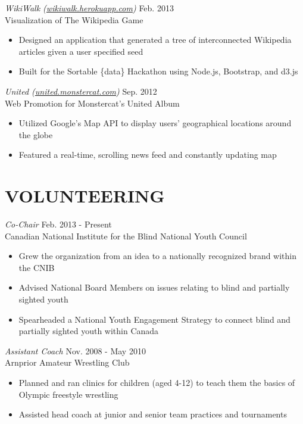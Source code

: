 \documentclass[margin]{res}
\begin{document}
\begin{resume}
{\sl WikiWalk (\href{http://wikiwalk.herokuapp.com}{wikiwalk.herokuapp.com}) } \hfill Feb. 2013 \\
Visualization of The Wikipedia Game
\begin{itemize} \itemsep -2pt
  \item Designed an application that generated a tree of interconnected Wikipedia articles given a user specified seed
  \item Built for the Sortable \{data\} Hackathon using Node.js, Bootstrap, and d3.js
\end{itemize}

{\sl United (\href{http://united.monstercat.com}{united.monstercat.com}) } \hfill Sep. 2012 \\
Web Promotion for Monstercat's United Album
\begin{itemize} \itemsep -2pt
  \item Utilized Google's Map API to display users' geographical locations around the globe
  \item Featured a real-time, scrolling news feed and constantly updating map
\end{itemize}

\section{VOLUNTEERING}
{\sl Co-Chair} \hfill Feb. 2013 - Present\\
Canadian National Institute for the Blind National Youth Council
\begin{itemize} \itemsep -2pt
	\item Grew the organization from an idea to a nationally recognized brand within the CNIB
	\item Advised National Board Members on issues relating to blind and partially sighted youth
  \item Spearheaded a National Youth Engagement Strategy to connect blind and partially sighted youth within Canada
\end{itemize}

{\sl Assistant Coach} \hfill Nov. 2008 - May 2010\\
Arnprior Amateur Wrestling Club
\begin{itemize}\itemsep -2pt
  \item Planned and ran clinics for children (aged 4-12) to teach them the basics of Olympic freestyle wrestling
  \item Assisted head coach at junior and senior team practices and tournaments
\end{itemize}

\end{resume}
\end{document}
